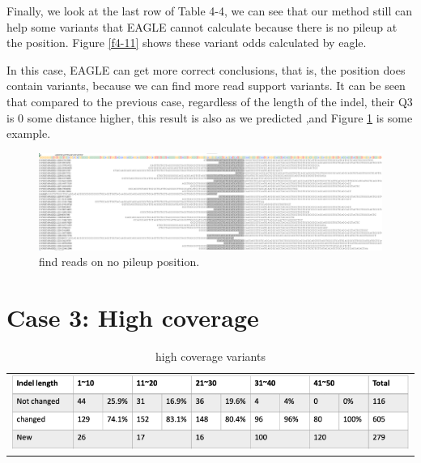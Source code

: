 Finally, we look at the last row of Table 4-4, we can see that our method still can help some variants that EAGLE cannot calculate because there is no pileup at the position. Figure \ref{f4-11} shows these variant odds calculated by eagle.

In this case, EAGLE can get more correct conclusions, that is, the position does contain variants, because we can find more read support variants. It can be seen that compared to the previous case, regardless of the length of the indel, their Q3 is 0 some distance higher, this result is also as we predicted ,and Figure \ref{f4-12} is some example.

\vspace{1cm}
\begin{figure}[H]
    \centering
    \includegraphics[width=1\columnwidth]{body/image/4-12.png}
    \captionsetup{labelfont=bf}
    \renewcommand{\baselinestretch}{1.0}
    \vspace{-1cm}
    \caption[find new pileup reads in medium coverage]{find reads on no pileup position.}
    \label{f4-12}
\end{figure}

\section{Case 3: High coverage}
\begin{table}[h]
    \centering
    \caption[high coverage variants]{high coverage variants}
     \vspace{-0.5cm}
    \begin{tabular}{c}
        \includegraphics[width=1\textwidth]{body/image/t4-6.png}
    \end{tabular}
    \label{t4-6}
\end{table}


